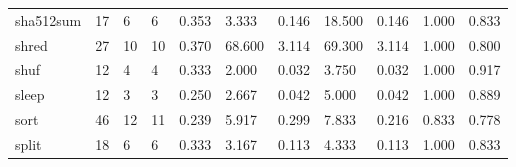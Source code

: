 \begin{longtable}{lp{1.2cm}p{1.2cm}p{1.2cm}p{1.2cm}p{1.2cm}p{1.2cm}p{1.2cm}p{1.2cm}p{1.2cm}p{1.2cm}}
sha512sum &                           17 &                  6 &                                 6 &                                      0.353 &                                  3.333 &                                        0.146 &                            18.500 &                                   0.146 &                              1.000 &                                              0.833 \\
shred     &                           27 &                 10 &                                10 &                                      0.370 &                                 68.600 &                                        3.114 &                            69.300 &                                   3.114 &                              1.000 &                                              0.800 \\
shuf      &                           12 &                  4 &                                 4 &                                      0.333 &                                  2.000 &                                        0.032 &                             3.750 &                                   0.032 &                              1.000 &                                              0.917 \\
sleep     &                           12 &                  3 &                                 3 &                                      0.250 &                                  2.667 &                                        0.042 &                             5.000 &                                   0.042 &                              1.000 &                                              0.889 \\
sort      &                           46 &                 12 &                                11 &                                      0.239 &                                  5.917 &                                        0.299 &                             7.833 &                                   0.216 &                              0.833 &                                              0.778 \\
split     &                           18 &                  6 &                                 6 &                                      0.333 &                                  3.167 &                                        0.113 &                             4.333 &                                   0.113 &                              1.000 &                                              0.833 \\

\end{longtable}
